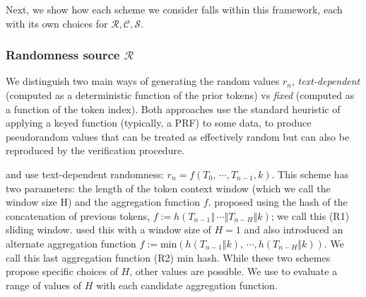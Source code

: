 Next, we show how each scheme we consider falls within this framework, each with its own choices for $\mathcal{R},\mathcal{C},\mathcal{S}$.

\subsubsection{Randomness source $\mathcal{R}$}\label{ssec:randomness}
%
We distinguish two main ways of generating the random values $r_n$, \emph{text-dependent} (computed as a deterministic function of the prior tokens) vs \emph{fixed} (computed as a function of the token index).
Both approaches use the standard heuristic of applying a keyed function (typically, a PRF) to some data, to produce pseudorandom values that can be treated as effectively random but can also be reproduced by the verification procedure.

\citet{aaronson_watermarking_2022} and \citet{kirchenbauer_watermark_2023}
use text-dependent randomness: $r_n = f\left(T_0,\,\cdots,T_{n-1},k\right)$.
%
This scheme has two parameters: the length of the token context window (which we call the window size H) and the aggregation function $f$.
%
\citet{aaronson_watermarking_2022} proposed using the hash of the concatenation of previous tokens, $f := h\left( T_{n-1} \mathbin\Vert \, \cdots \mathbin\Vert T_{n-H} \mathbin\Vert k\right)$; we call this (R1) sliding window.
%
\citet{kirchenbauer_watermark_2023} used this with a window size of $ H = 1$ and also introduced an alternate aggregation function $f := \text{min} \left( h\left( T_{n-1} \mathbin\Vert k\right), \, \cdots, h\left( T_{n-H} \mathbin\Vert k\right) \right)$.
%
We call this last aggregation function (R2) min hash.
%
While these two schemes propose specific choices of $H$, other values are possible. 
We use \benchmarkname{} to evaluate a range of values of $H$ with each candidate aggregation function.

